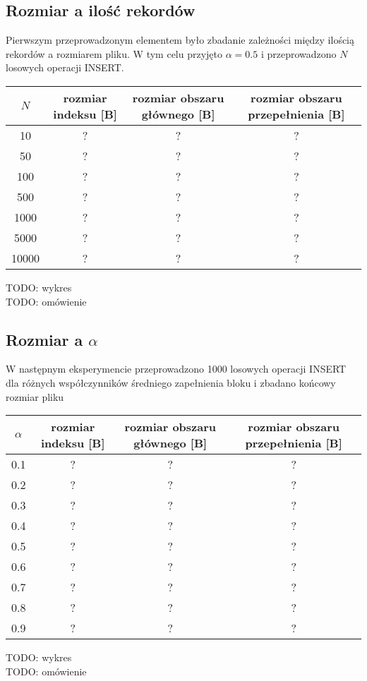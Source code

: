 \documentclass{article}
\begin{document}
\subsection{Rozmiar a ilość rekordów}
Pierwszym przeprowadzonym elementem było zbadanie zależności między ilością rekordów a rozmiarem pliku.  W tym celu przyjęto $\alpha = 0.5$ i przeprowadzono $N$ losowych operacji INSERT.
\begin{center}
\begin{tabular}{ c | c c c }
 $N$ & rozmiar indeksu [B] & rozmiar obszaru głównego [B] & rozmiar obszaru przepełnienia [B]  \\ 
\hline
  10 & ? & ? & ? \\
  50 & ? & ? & ? \\
  100 & ? & ? & ? \\
  500  & ? & ? & ? \\
  1000 & ? & ? & ? \\
  5000 & ? & ? & ? \\
  10000 & ? & ? & ? \\
\end{tabular}
\end{center}
TODO: wykres \\
TODO: omówienie
\subsection{Rozmiar a $\alpha$}
W następnym eksperymencie przeprowadzono 1000 losowych operacji INSERT dla różnych współczynników średniego zapełnienia bloku i zbadano końcowy rozmiar pliku
\begin{center}
\begin{tabular}{ c | c c c }
 $\alpha$ & rozmiar indeksu [B] & rozmiar obszaru głównego [B] & rozmiar obszaru przepełnienia [B]  \\ 
\hline
  0.1 & ? & ? & ? \\
   0.2 & ? & ? & ? \\
  0.3 & ? & ? & ? \\
  0.4 & ? & ? & ? \\
  0.5 & ? & ? & ? \\
  0.6 & ? & ? & ? \\
  0.7 & ? & ? & ? \\
  0.8 & ? & ? & ? \\
  0.9 & ? & ? & ? \\
\end{tabular}
\end{center}
TODO: wykres \\
TODO: omówienie
\end{document}
